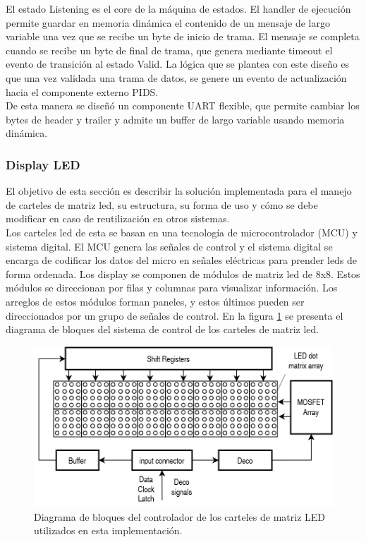 El estado Listening es el core de la máquina de estados. El handler de ejecución permite guardar en memoria dinámica el contenido de un mensaje de largo variable una vez que se recibe un byte de inicio de trama.  El mensaje se completa cuando se recibe un byte de final de trama, que genera mediante timeout el evento de transición al estado Valid. La lógica que se plantea con este diseño es que una vez validada una trama de datos, se genere un evento de actualización hacia el componente externo PIDS.\\

De esta manera se diseñó un componente UART flexible, que permite cambiar los bytes de header y trailer y admite un buffer de largo variable usando memoria dinámica. \\

\subsubsection{Display LED}

El objetivo de esta sección es describir la solución implementada para el manejo de carteles de matriz led, su estructura, su forma de uso y cómo se debe modificar en caso de reutilización en otros sistemas.\\

Los carteles led de esta se basan en una tecnología de microcontrolador (MCU) y sistema digital. El MCU genera las señales de control y el sistema digital se encarga de codificar los datos del micro en señales eléctricas para prender leds de forma ordenada. Los display se componen de módulos de matriz led de 8x8. Estos módulos se direccionan por filas y columnas para  visualizar información. Los arreglos de estos módulos forman paneles, y estos últimos pueden ser direccionados por un grupo de señales de control. En la figura \ref{fig:diagDriverLED} se presenta el diagrama de bloques del sistema de control de los carteles de matriz led.\\


\begin{figure}[ht]
	\centering
	\includegraphics[width=1\textwidth]{./Figures/diagDriverLED.png}
	\caption{Diagrama de bloques del controlador de los carteles de matriz LED utilizados en esta implementación.}
	\label{fig:diagDriverLED}
\end{figure}

